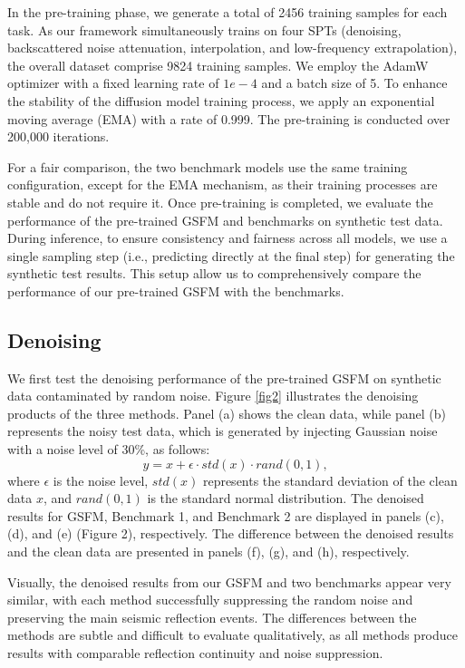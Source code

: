 In the pre-training phase, we generate a total of 2456 training samples for each task. As our framework simultaneously trains on four SPTs (denoising, backscattered noise attenuation, interpolation, and low-frequency extrapolation), the overall dataset comprise 9824 training samples. We employ the AdamW optimizer with a fixed learning rate of $1e-4$ and a batch size of 5. To enhance the stability of the diffusion model training process, we apply an exponential moving average (EMA) with a rate of 0.999. The pre-training is conducted over 200,000 iterations. 

For a fair comparison, the two benchmark models use the same training configuration, except for the EMA mechanism, as their training processes are stable and do not require it. Once pre-training is completed, we evaluate the performance of the pre-trained GSFM and benchmarks on synthetic test data. During inference, to ensure consistency and fairness across all models, we use a single sampling step (i.e., predicting directly at the final step) for generating the synthetic test results. This setup allow us to comprehensively compare the performance of our pre-trained GSFM with the benchmarks. 

\subsection{Denoising}
We first test the denoising performance of the pre-trained GSFM on synthetic data contaminated by random noise. Figure \ref{fig2} illustrates the denoising products of the three methods. Panel (a) shows the clean data, while panel (b) represents the noisy test data, which is generated by injecting Gaussian noise with a noise level of 30\%, as follows:
\begin{equation}\label{eq14}
y=x+\epsilon \cdot std(x) \cdot rand(0,1),
\end{equation}
where $\epsilon$ is the noise level, $std(x)$ represents the standard deviation of the clean data $x$, and $rand(0,1)$ is the standard normal distribution. The denoised results for GSFM, Benchmark 1, and Benchmark 2 are displayed in panels (c), (d), and (e) (Figure 2), respectively. The difference between the denoised results and the clean data are presented in panels (f), (g), and (h), respectively. 

Visually, the denoised results from our GSFM and two benchmarks appear very similar, with each method successfully suppressing the random noise and preserving the main seismic reflection events. The differences between the methods are subtle and difficult to evaluate qualitatively, as all methods produce results with comparable reflection continuity and noise suppression. 

